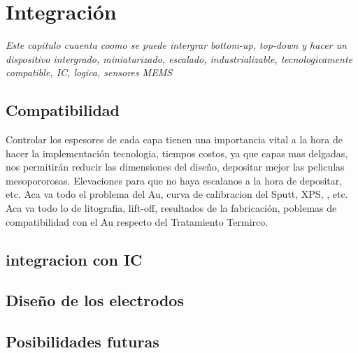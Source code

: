  \newcommand{\NoBiblioInt}[1]{
 \ifthenelse{\equal{#1}{verdadero}}{}{}
 \NoBiblioInt{verdadero}}


 \FormatoCapituloUnaLinea
 
 \chapter{Integración}
 \label{chap:Integracion}

 \thispagestyle{empty}
	
 \noindent\textit{Este capitulo cuaenta coomo se puede intergrar bottom-up, top-down y hacer un dispositivo intergrado, miniaturizado, escalado, industrializable, tecnologicamente compatible, IC, logica, sensores MEMS}

 \vfill
 \minitoc
 \newpage

\section{Compatibilidad}

Controlar los espesores de cada capa tienen una importancia vital a la hora de hacer la implementación tecnologia, tiempos costos, ya que capas mas delgadas, nos permitirán reducir las dimensiones del diseño, depositar mejor las peliculas mesopororosas. Elevaciones para que no haya escalanos a la hora de depositar, etc.
Aca va todo el problema del Au, curva de calibracion del Sputt, XPS, , etc.
Aca va todo lo de litografia, lift-off, resultados de la fabricación, poblemas de compatibilidad con el Au respecto del Tratamiento Termirco.

\section{integracion con IC}

\section{Diseño de los electrodos}

\section{Posibilidades futuras}